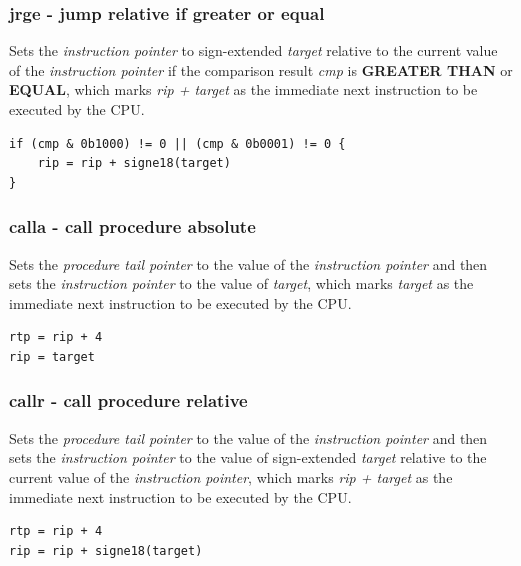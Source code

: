 \documentclass[a4paper,10pt]{article}
\begin{document}
\subsubsection{jrge - jump relative if greater or equal}
	{Sets the \emph{instruction pointer} to sign-extended \emph{target} relative to the current value of the \emph{instruction pointer} if the comparison result \emph{cmp} is \textbf{GREATER THAN} or \textbf{EQUAL}, which marks \emph{rip + target} as the immediate next instruction to be executed by the CPU.}
\begin{lstlisting}
if (cmp & 0b1000) != 0 || (cmp & 0b0001) != 0 {
	rip = rip + signe18(target)
}
\end{lstlisting}


\subsubsection{calla - call procedure absolute}
	{Sets the \emph{procedure tail pointer} to the value of the \emph{instruction pointer} and then sets the \emph{instruction pointer} to the value of \emph{target}, which marks \emph{target} as the immediate next instruction to be executed by the CPU.}
\begin{lstlisting}
rtp = rip + 4
rip = target
\end{lstlisting}

\subsubsection{callr - call procedure relative}
	{Sets the \emph{procedure tail pointer} to the value of the \emph{instruction pointer} and then sets the \emph{instruction pointer} to the value of sign-extended \emph{target} relative to the current value of the \emph{instruction pointer}, which marks \emph{rip + target} as the immediate next instruction to be executed by the CPU.}
\begin{lstlisting}
rtp = rip + 4
rip = rip + signe18(target)
\end{lstlisting}
\end{document}
